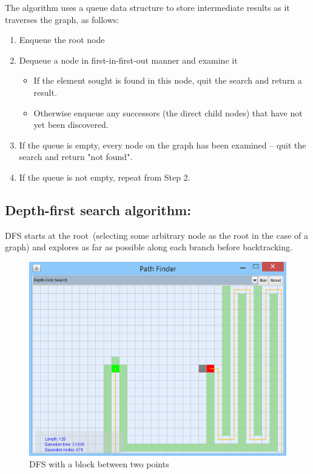 \documentclass[a4paper]{article}
\begin{document}
The algorithm uses a queue data structure to store intermediate results as it traverses the graph, as follows:\\

\begin{enumerate}
\item Enqueue the root node
\item Dequeue a node in first-in-first-out manner and examine it
	\begin{itemize}
		\item If the element sought is found in this node, quit the search and return a result.
		\item Otherwise enqueue any successors (the direct child nodes) that have not yet been discovered.
	\end{itemize}
\item If the queue is empty, every node on the graph has been examined – quit the search and return "not found". \\
\item If the queue is not empty, repeat from Step 2.
\end{enumerate}


\subsection{Depth-first search algorithm:}

DFS starts at the root (selecting some arbitrary node as the root in the case of a graph) and explores as far as possible along each branch before backtracking. \\

\begin{figure}[h!]
  \centering
    \includegraphics[scale=.9]{images/dfs1.png}
  \caption{DFS with a block between two points}
\end{figure}
\end{document}
